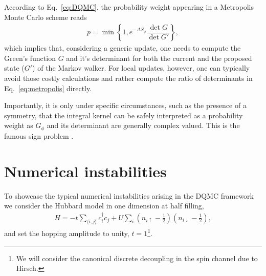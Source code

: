 \documentclass[submission, Phys]{SciPost}
\begin{document}
According to Eq.~\eqref{eq:DQMC}, the probability weight appearing in a Metropolis Monte Carlo scheme reads
\begin{align}
	p = \min \left\{ 1 , e^{-\Delta S_\phi}  \dfrac{\det G}{\det G'} \right\}, \label{eq:metropolis}
\end{align}
which implies that, considering a generic update, one needs to compute the Green's function $G$ and it's determinant for both the current and the proposed state ($G'$) of the Markov walker. For local updates, however, one can typically avoid those costly calculations and rather compute the ratio of determinants in Eq.~\eqref{eq:metropolis} directly.

Importantly, it is only under specific circumstances, such as the presence of a symmetry, that the integral kernel can be safely interpreted as a probability weight as $G_\phi$ and its determinant are generally complex valued. This is the famous sign problem \cite{Li2019}.

\section{Numerical instabilities}\label{sec:instabilities}

To showcase the typical numerical instabilities arising in the DQMC framework we consider the Hubbard model in one dimension at half filling,
\begin{align}
	H = -t\sum_{\langle i,j \rangle} c_i^\dagger c_j + U \sum_i \left( n_{i\uparrow} - \frac{1}{2} \right) \left( n_{i\downarrow} - \frac{1}{2} \right) \label{eq:model},
\end{align}
and set the hopping amplitude to unity, $t=1$\footnote{We will consider the canonical discrete decoupling \cite{Hirsch1983} in the spin channel due to Hirsch.}.
\end{document}
